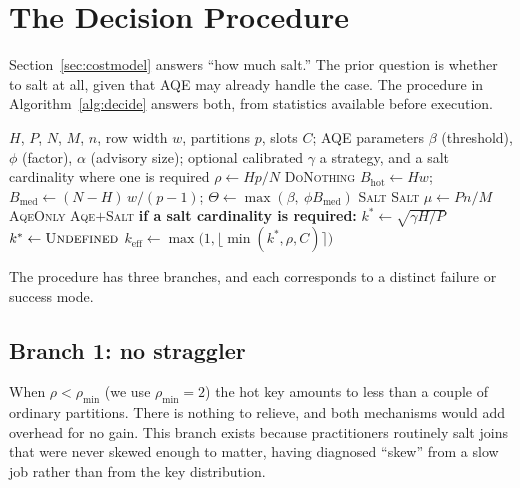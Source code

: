 \section{The Decision Procedure}
\label{sec:decision}

Section~\ref{sec:costmodel} answers ``how much salt.'' The prior question is
whether to salt at all, given that AQE may already handle the case. The
procedure in Algorithm~\ref{alg:decide} answers both, from statistics available
before execution.

\begin{algorithm}[t]
\caption{Skew mitigation decision procedure. Branch structure and thresholds
are a direct transcription of \texttt{costmodel.decide} and
\texttt{costmodel.recommend\_k} in the released artifact.}
\label{alg:decide}
\begin{algorithmic}[1]
\REQUIRE $H$, $P$, $N$, $M$, $n$, row width $w$, partitions $p$, slots $C$;
         AQE parameters $\beta$ (threshold), $\phi$ (factor), $\alpha$
         (advisory size); optional calibrated $\gamma$
\ENSURE  a strategy, and a salt cardinality where one is required
\STATE $\rho \leftarrow H p / N$
\IF{$\rho < \rho_{\min}$}
    \RETURN \textsc{DoNothing} 
\ENDIF
\STATE $B_{\text{hot}} \leftarrow H w$;\quad
       $B_{\text{med}} \leftarrow (N-H)\,w/(p-1)$;\quad
       $\Theta \leftarrow \max(\beta,\ \phi B_{\text{med}})$
    \RETURN \textsc{Salt} 
\ENDIF
{}
    \RETURN \textsc{Salt} 
\ENDIF
\STATE $\mu \leftarrow P n / M$
\IF{$\mu \le \mu_{\min}$}
    \RETURN \textsc{AqeOnly}
\ELSE
    \RETURN \textsc{Aqe}$+$\textsc{Salt}
\ENDIF
\medskip
\STATE \textbf{if a salt cardinality is required:}
    \STATE $k^{*} \leftarrow \sqrt{\gamma H / P}$
\ELSE
    \STATE $k^{*} \leftarrow \textsc{Undefined}$ 
\ENDIF
\RETURN $k_{\text{eff}} \leftarrow \max\bigl(1, \lfloor\min(k^{*}, \rho, C)\rceil\bigr)$
\end{algorithmic}
\end{algorithm}

The procedure has three branches, and each corresponds to a distinct failure or
success mode.

\subsection{Branch 1: no straggler}
When $\rho < \rho_{\min}$ (we use $\rho_{\min}=2$) the hot key amounts to less
than a couple of ordinary partitions. There is nothing to relieve, and both
mechanisms would add overhead for no gain. This branch exists because
practitioners routinely salt joins that were never skewed enough to matter,
having diagnosed ``skew'' from a slow job rather than from the key
distribution.

